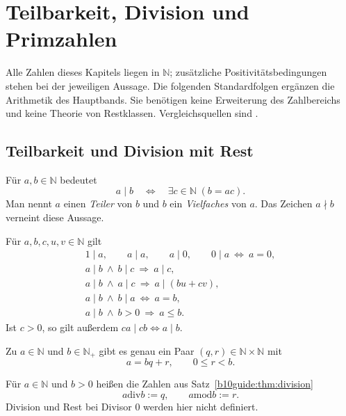 \chapter{Teilbarkeit, Division und Primzahlen}
\label{b10guide:ch:divisibility}

Alle Zahlen dieses Kapitels liegen in $\mathbb N$; zusätzliche
Positivitätsbedingungen stehen bei der jeweiligen Aussage.
Die folgenden Standardfolgen ergänzen die Arithmetik des Hauptbands.
Sie benötigen keine Erweiterung des Zahlbereichs und keine
Theorie von Restklassen. Vergleichsquellen sind
\cite{natgcd,natprime,natfactors,natinfinite}.

\section{Teilbarkeit und Division mit Rest}

\begin{definition}[Teilbarkeit]
\label{b10guide:def:divisibility}
Für $a,b\in\mathbb N$ bedeutet
\[
 a\mid b\quad\Longleftrightarrow\quad
 \exists c\in\mathbb N\;(b=ac).
\]
Man nennt $a$ einen \emph{Teiler} von $b$ und $b$ ein
\emph{Vielfaches} von $a$. Das Zeichen $a\nmid b$ verneint diese Aussage.
\end{definition}

\begin{theorem}
Für $a,b,c,u,v\in\mathbb N$ gilt
\[
\begin{gathered}
 1\mid a,\qquad a\mid a,\qquad a\mid0,\qquad
 0\mid a\ \Longleftrightarrow\ a=0,\\
 a\mid b\ \land\ b\mid c\ \Longrightarrow\ a\mid c,\\
 a\mid b\ \land\ a\mid c\ \Longrightarrow\ a\mid(bu+cv),\\
 a\mid b\ \land\ b\mid a\ \Longleftrightarrow\ a=b,\\
 a\mid b\ \land\ b>0\ \Longrightarrow\ a\le b.
\end{gathered}
\]
Ist $c>0$, so gilt außerdem $ca\mid cb\Longleftrightarrow a\mid b$.
\end{theorem}

\begin{theorem}
\label{b10guide:thm:division}
Zu $a\in\mathbb N$ und $b\in\mathbb N_+$ gibt es genau ein Paar
$(q,r)\in\mathbb N\times\mathbb N$ mit
\[
 a=bq+r,\qquad 0\le r<b.
\]
\end{theorem}

\begin{definition}
Für $a\in\mathbb N$ und $b>0$ heißen die Zahlen aus
Satz~\ref{b10guide:thm:division}
\[
 a\mathbin{\mathrm{div}}b:=q,\qquad
 a\mathbin{\mathrm{mod}}b:=r.
\]
Division und Rest bei Divisor $0$ werden hier nicht definiert.
\end{definition}

